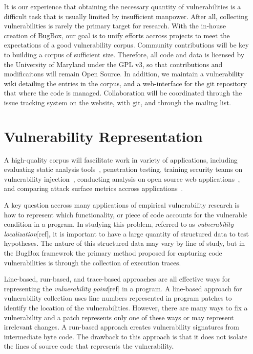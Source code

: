 \documentclass[letterpaper,twocolumn,10pt]{article}
\begin{document}
It is our experience that obtaining the necessary quantity of vulnerabilities is a difficult task that is usually limited by insufficient manpower. After all, collecting vulnerabilities is rarely the primary target for research. With the in-house creation of BugBox, our goal is to unify efforts accross projects to meet the expectations of a good vulnerability corpus. Community contributions will be key to building a corpus of sufficient size. Therefore, all code and data is licensed by the University of Maryland under the GPL v3, so that contributions and modificaitons will remain Open Source. In addition, we maintain a vulnerability wiki detailing the entries in the corpus, and a web-interface for the git repository that where the code is managed. Collaboration will be coordinated through the issue tracking system on the website, with git, and through the mailing list. \par

\section{Vulnerability Representation}

A high-quality corpus will fascilitate work in variety of applications, including evaluating static analysis tools~\cite{Zitser:2004:TSA:1041685.1029911}, penetration testing, training security teams on vulnerability injection~\cite{4725309}, conducting analysis on open source web applications~\cite{DBLP:journals/ese/HuynhM10}, and comparing attack surface metrics accross applications~\cite{Stuckman:2012:CAA:2372225.2372229}. \par

A key question accross many applications of empirical vulnerability research is how to represent which functionality, or piece of code accounts for the vulnerable condition in a program. In studying this problem, referred to as \emph{vulnerability localization}[ref], it is important to have a large quantity of structured data to test hypotheses. The nature of this structured data may vary by line of study, but in the BugBox framewrok the primary method proposed for capturing code vulnerabilities is through the collection of execution traces. \par
 
Line-based, run-based, and trace-based approaches are all effective ways for representing the \emph{vulnerability point}[ref] in a program.   A line-based\cite{4630094} approach for vulnerability collection uses line numbers represented in program patches to identify the location of the vulnerabilities.  However, there are many ways to fix a vulnerability and a patch represents only one of these ways or may represent irrelevant changes.  A run-based\cite{Song:2008:BNA:1496255.1496257} approach creates vulnerability signatures from intermediate byte code.  The drawback to this approach is that it does not isolate the lines of source code that represents the vulnerability. 
\end{document}

